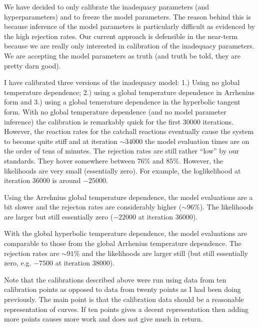 

We have decided to only calibrate the inadequacy parameters (and hyperparameters)
and to freeze the model parameters.  The reason behind this is because inference
of the model parameters is particularly difficult as evidenced by the high
rejection rates.  Our current approach is defensible in the near-term because we
are really only interested in calibration of the inadequacy parameters.  We are
accepting the model parameters as truth (and truth be told, they are pretty 
darn good).

I have calibrated three versions of the inadequacy model: 1.) Using no global
temperature dependence; 2.) using a global temperature dependence in Arrhenius
form and 3.) using a global temerature dependence in the hyperbolic tangent form.
With no global temperature dependence (and no model parameter inference) the 
calibration is remarkably quick for the first $30000$ iterations.  However, 
the reaction rates for the catchall reactions eventually cause the system to 
become quite stiff and at iteration $\sim 34000$ the model evaluation times 
are on the order of tens of minutes.  The rejection rates are still rather ``low''
by our standards.  They hover somewhere between $76\%$ and $85\%$.  However,
the likelihoods are very small (essentially zero).  For example, the loglikelihood
at iteration $36000$ is around $-25000$.

Using the Arrehnius global temperature dependence, the model evaluations are
a bit slower and the rejecton rates are considerably higher ($\sim 96\%$).  
The likelihoods are larger but still essentially zero ($-22000$ at iteration
$36000$).

With the global hyperbolic temperature dependence, the model evaluations 
are comparable to those from the global Arrhenius temperature dependence. 
The rejection rates are $\sim 91\%$ and the likelihoods are larger still 
(but still essentially zero, e.g. $-7500$ at iteration $38000$).

Note that the calibrations described above were run using data from 
ten calibration points as opposed to data from twenty points as I had been
doing previously.  The main point is that the calibration data should be 
a reasonable representation of curves.  If ten points gives a decent 
representation then adding more points causes more work and does not 
give much in return.

